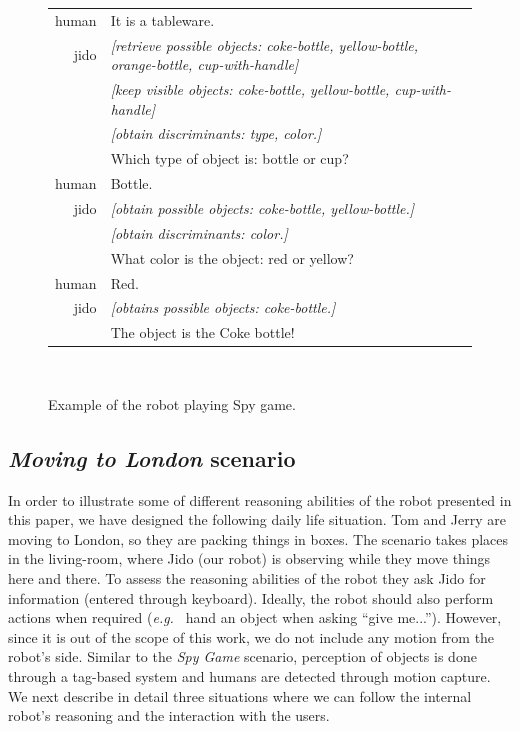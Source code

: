 \documentclass[twocolumn]{svjour3}
\newcommand{\chatN}[1]{{\footnotesize \textsf{#1}}}
\newcommand{\eg}{{\textit{e.g.~}}}
\begin{document}
\begin{figure}
\centering
	\begin{tabular}{r|p{6cm}}
		\chatN{human} & It is a tableware.\\
		\chatN{jido} & \emph{[retrieve possible objects: coke-bottle, yellow-bottle, orange-bottle, cup-with-handle]} \\
	 			& \emph{[keep visible objects: coke-bottle, yellow-bottle, cup-with-handle]}\\
				& \emph{[obtain discriminants: type, color.]}\\
				& Which type of object is: bottle or cup? \\
		\chatN{human} & Bottle.\\
		\chatN{jido} & \emph{[obtain possible objects: coke-bottle, yellow-bottle.]}\\
				& \emph{[obtain discriminants: color.]}\\
				& What color is the object: red or yellow?\\
		\chatN{human} & Red.\\
		\chatN{jido} & \emph{[obtains possible objects: coke-bottle.]}\\
				& The object is the Coke bottle!	
	\end{tabular}\\
	\caption{Example of the robot playing Spy game.}
	\label{fig|spyGameExample}
\end{figure}

\subsection{\emph{Moving to London} scenario}

In order to illustrate some of different reasoning abilities of the robot presented in this paper, we have designed the following
daily life situation. Tom and Jerry are moving to London, so they are packing
things in boxes. The scenario takes places in the living-room, where Jido (our
robot) is observing while they move things here and there. To assess the
reasoning abilities of the robot they ask Jido for information (entered through
keyboard). Ideally, the robot should also perform actions when required (\eg
hand an object when asking ``give me...''). However, since it is out of the
scope of this work, we do not include any motion from the robot's side. Similar
to the \emph{Spy Game} scenario, perception of objects is done through a tag-based
system and humans are detected through motion capture. We next describe in
detail three situations where we can follow the internal robot's reasoning and
the interaction with the users.
\end{document}
